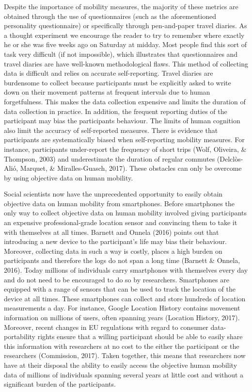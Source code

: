 \documentclass[man]{apa6}
\theoremstyle{definition}
\theoremstyle{definition}
\theoremstyle{definition}
\theoremstyle{remark}
\begin{document}
Despite the importance of mobility measures, the majority of these
metrics are obtained through the use of questionnaires (such as the
aforementioned personality questionnaire) or specifically through
pen-and-paper travel diaries. As a thought experiment we encourage the
reader to try to remember where exactly he or she was five weeks ago on
Saturday at midday. Most people find this sort of task very difficult
(if not impossible), which illustrates that questionnaires and travel
diaries are have well-known methodological flaws. This method of
collecting data is difficult and relies on accurate self-reporting.
Travel diaries are burdensome to collect because participants must be
explicitly asked to write down on their movement patterns at frequent
intervals due to human forgetfulness. This makes the data collection
expensive and limits the duration of data collection in practice. In
addition, the frequent reporting duties of the participant may bias the
participants behaviour. The limits of human cognition also limit the
accuracy of self-reported measures. There is evidence that participants
are systematically biased when self-reporting mobility measures. For
instance, participants under-report the frequency of short trips (Wolf,
Oliveira, \& Thompson, 2003) and underestimate the duration of regular
commutes (Delclòs-Alió, Marquet, \& Miralles-Guasch, 2017). These
obstacles can only be overcome by using objective data on human
mobility.

Social scientists now have the unprecedented opportunity to easily
obtain objective data on human mobility from smartphones. Before
smartphones the only way to collect objective data on human mobility
involved giving participants an expensive professional-grade location
sensor and convincing them to take it with themselves at all times.
Barnett and Onnela (2016) points out that introducing a new device to
the participant's life may bias their behaviour. Moreover, collecting
data in such a way is costly, places a high burden on participants and
therefore the logs do not span a long time (Barnett \& Onnela, 2016).
Today millions of individuals carry smartphones with themselves every
day and do not need to be encouraged to do so by researchers.
Smartphones are equipped with a range of sensors that can be used to
track the location of the device at all times. These smartphones can
collect and store hundreds of location measurements a day. For instance,
Google Location History contains movement information on millions of
users, often spanning years (Location History, 2017). Moreover, recent
changes in EU regulations with regard to consumer data-portability
rights ensure that a willing participant should be able to easily share
this information with researchers at no cost to the either the
participant or the researchers (Commission, 2017). Taken together, this
means that researchers now have at their disposal the ability to easily
access the objective human mobility data of millions of individuals
spanning several years at little cost and without a significant burden
of the participants.
\end{document}
